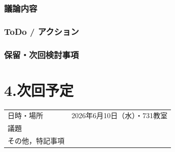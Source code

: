 \documentclass[a4paper,12pt]{ltjsarticle}
\begin{document}
\subsubsection*{議論内容}

\subsubsection*{ToDo / アクション}

\subsubsection*{保留・次回検討事項}

\section*{4.次回予定}
\begin{tabular}{ll}
  \toprule
  日時・場所 & 2026年6月10日（水）・731教室 \\
  議題       &  \\
  その他，特記事項 & \\
  \bottomrule
\end{tabular}
\end{document}
